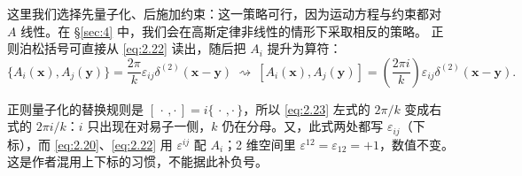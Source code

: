这里我们选择先量子化、后施加约束：这一策略可行，因为运动方程与约束都对 $A$ 线性。在 \S\ref{sec:4} 中，我们会在高斯定律非线性的情形下采取相反的策略。
正则泊松括号可直接从 \eqref{eq:2.22} 读出，随后把 $A_i$ 提升为算符：
\begin{equation}\tag{2.23}\label{eq:2.23}
  \{A_i(\mathbf x), A_j(\mathbf y)\}
  = \frac{2\pi}{k}\varepsilon_{ij}\delta^{(2)}(\mathbf x-\mathbf y)
  \ \rightsquigarrow\
  [A_i(\mathbf x), A_j(\mathbf y)]
  = \left(\frac{2\pi i}{k}\right)\varepsilon_{ij}\delta^{(2)}(\mathbf x-\mathbf y).
\end{equation}

\begin{yizhu}[易错点]
正则量子化的替换规则是 $[\,\cdot\,,\cdot\,] = i\{\,\cdot\,,\cdot\,\}$，所以 \eqref{eq:2.23} 左式的 $2\pi/k$ 变成右式的 $2\pi i/k$：$i$ 只出现在对易子一侧，$k$ 仍在分母。又，此式两处都写 $\varepsilon_{ij}$（下标），而 \eqref{eq:2.20}、\eqref{eq:2.22} 用 $\varepsilon^{ij}$ 配 $A_i$；2 维空间里 $\varepsilon^{12}=\varepsilon_{12}=+1$，数值不变。这是作者混用上下标的习惯，不能据此补负号。
\end{yizhu}

